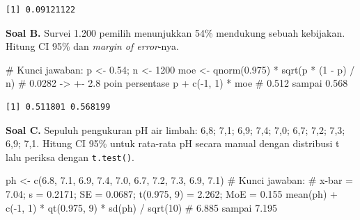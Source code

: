\documentclass[
  indonesian,
  letterpaper,
]{book}
\newenvironment{Shaded}{\begin{snugshade}}{\end{snugshade}}
\newcommand{\CommentTok}[1]{\textcolor[rgb]{0.37,0.37,0.37}{#1}}
\newcommand{\DecValTok}[1]{\textcolor[rgb]{0.68,0.00,0.00}{#1}}
\newcommand{\FloatTok}[1]{\textcolor[rgb]{0.68,0.00,0.00}{#1}}
\newcommand{\FunctionTok}[1]{\textcolor[rgb]{0.28,0.35,0.67}{#1}}
\newcommand{\NormalTok}[1]{\textcolor[rgb]{0.00,0.23,0.31}{#1}}
\newcommand{\OtherTok}[1]{\textcolor[rgb]{0.00,0.23,0.31}{#1}}
\newcommand{\SpecialCharTok}[1]{\textcolor[rgb]{0.37,0.37,0.37}{#1}}
\begin{document}
\begin{verbatim}
[1] 0.09121122
\end{verbatim}

\textbf{Soal B.} Survei 1.200 pemilih menunjukkan 54\% mendukung sebuah
kebijakan. Hitung CI 95\% dan \emph{margin of error}-nya.

\begin{Shaded}
\begin{Highlighting}[]
\CommentTok{\# Kunci jawaban:}
\NormalTok{p }\OtherTok{\textless{}{-}} \FloatTok{0.54}\NormalTok{; n }\OtherTok{\textless{}{-}} \DecValTok{1200}
\NormalTok{moe }\OtherTok{\textless{}{-}} \FunctionTok{qnorm}\NormalTok{(}\FloatTok{0.975}\NormalTok{) }\SpecialCharTok{*} \FunctionTok{sqrt}\NormalTok{(p }\SpecialCharTok{*}\NormalTok{ (}\DecValTok{1} \SpecialCharTok{{-}}\NormalTok{ p) }\SpecialCharTok{/}\NormalTok{ n)   }\CommentTok{\# 0.0282 {-}\textgreater{} +{-} 2.8 poin persentase}
\NormalTok{p }\SpecialCharTok{+} \FunctionTok{c}\NormalTok{(}\SpecialCharTok{{-}}\DecValTok{1}\NormalTok{, }\DecValTok{1}\NormalTok{) }\SpecialCharTok{*}\NormalTok{ moe                            }\CommentTok{\# 0.512 sampai 0.568}
\end{Highlighting}
\end{Shaded}

\begin{verbatim}
[1] 0.511801 0.568199
\end{verbatim}

\textbf{Soal C.} Sepuluh pengukuran pH air limbah: 6,8; 7,1; 6,9; 7,4;
7,0; 6,7; 7,2; 7,3; 6,9; 7,1. Hitung CI 95\% untuk rata-rata pH secara
manual dengan distribusi t lalu periksa dengan \texttt{t.test()}.

\begin{Shaded}
\begin{Highlighting}[]
\NormalTok{ph }\OtherTok{\textless{}{-}} \FunctionTok{c}\NormalTok{(}\FloatTok{6.8}\NormalTok{, }\FloatTok{7.1}\NormalTok{, }\FloatTok{6.9}\NormalTok{, }\FloatTok{7.4}\NormalTok{, }\FloatTok{7.0}\NormalTok{, }\FloatTok{6.7}\NormalTok{, }\FloatTok{7.2}\NormalTok{, }\FloatTok{7.3}\NormalTok{, }\FloatTok{6.9}\NormalTok{, }\FloatTok{7.1}\NormalTok{)}
\CommentTok{\# Kunci jawaban:}
\CommentTok{\# x{-}bar = 7.04; s = 0.2171; SE = 0.0687; t(0.975, 9) = 2.262; MoE = 0.155}
\FunctionTok{mean}\NormalTok{(ph) }\SpecialCharTok{+} \FunctionTok{c}\NormalTok{(}\SpecialCharTok{{-}}\DecValTok{1}\NormalTok{, }\DecValTok{1}\NormalTok{) }\SpecialCharTok{*} \FunctionTok{qt}\NormalTok{(}\FloatTok{0.975}\NormalTok{, }\DecValTok{9}\NormalTok{) }\SpecialCharTok{*} \FunctionTok{sd}\NormalTok{(ph) }\SpecialCharTok{/} \FunctionTok{sqrt}\NormalTok{(}\DecValTok{10}\NormalTok{)   }\CommentTok{\# 6.885 sampai 7.195}
\end{Highlighting}
\end{Shaded}
\end{document}
